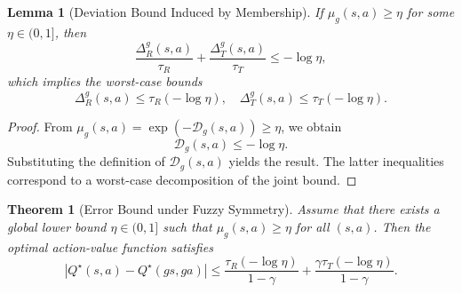 \documentclass[lettersize,journal]{IEEEtran}
\newtheorem{lemma}{Lemma}
\newtheorem{theorem}{Theorem}
\begin{document}
\vspace{0.5em}

\begin{lemma}[Deviation Bound Induced by Membership]
\label{lemma:membership_bound}
If $\mu_g(s,a) \ge \eta$ for some $\eta \in (0,1]$, then
\begin{equation}
    \frac{\Delta_R^g(s,a)}{\tau_R} + \frac{\Delta_T^g(s,a)}{\tau_T}
    \le -\log\eta,
\end{equation}
which implies the worst-case bounds
\begin{equation}
    \Delta_R^g(s,a) \le \tau_R(-\log\eta), \quad
    \Delta_T^g(s,a) \le \tau_T(-\log\eta).
\end{equation}
\end{lemma}

\begin{proof}
From $\mu_g(s,a)=\exp(-\mathcal D_g(s,a)) \ge \eta$, we obtain
\[
\mathcal D_g(s,a) \le -\log\eta.
\]
Substituting the definition of $\mathcal D_g(s,a)$ yields the result. The latter inequalities correspond to a worst-case decomposition of the joint bound.
\end{proof}

\vspace{0.5em}

\begin{theorem}[Error Bound under Fuzzy Symmetry]
\label{thm:fuzzy_error_bound}
Assume that there exists a global lower bound $\eta \in (0,1]$ such that $\mu_g(s,a) \ge \eta$ for all $(s,a)$. Then the optimal action-value function satisfies
\begin{equation}
    |Q^\star(s,a) - Q^\star(gs,ga)|
    \le
    \frac{\tau_R(-\log\eta)}{1-\gamma}
    +
    \frac{\gamma \tau_T(-\log\eta)}{1-\gamma}.
\end{equation}
\end{theorem}
\end{document}
